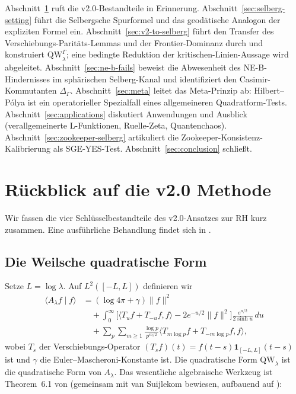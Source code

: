 \documentclass[12pt,a4paper]{article}
\theoremstyle{definition}
\theoremstyle{remark}
\newcommand{\QW}{\mathrm{QW}}
\newcommand{\Delop}{\Delta_{\Gamma}}
\begin{document}
Abschnitt~\ref{sec:v2-recollect} ruft die v2.0-Bestandteile in Erinnerung.
Abschnitt~\ref{sec:selberg-setting} führt die Selbergsche Spurformel und das
geodätische Analogon der expliziten Formel ein.
Abschnitt~\ref{sec:v2-to-selberg} führt den Transfer des Verschiebungs-Paritäts-Lemmas und der
Frontier-Dominanz durch und konstruiert $\QW^\Gamma_\lambda$; eine bedingte
Reduktion der kritischen-Linien-Aussage wird abgeleitet.
Abschnitt~\ref{sec:ne-b-fails} beweist die Abwesenheit des NE-B-Hindernisses im
sphärischen Selberg-Kanal und identifiziert den Casimir-Kommutanten $\Delop$.
Abschnitt~\ref{sec:meta} leitet das Meta-Prinzip ab: Hilbert--Pólya ist ein
operatorieller Spezialfall eines allgemeineren Quadratform-Tests.
Abschnitt~\ref{sec:applications} diskutiert Anwendungen und Ausblick
(verallgemeinerte L-Funktionen, Ruelle-Zeta, Quantenchaos).
Abschnitt~\ref{sec:zookeeper-selberg} artikuliert die Zookeeper-Konsistenz-Kalibrierung als SGE-YES-Test.
Abschnitt~\ref{sec:conclusion} schließt.


\section{Rückblick auf die v2.0 Methode}
\label{sec:v2-recollect}

Wir fassen die vier Schlüsselbestandteile des v2.0-Ansatzes zur RH kurz zusammen. Eine
ausführliche Behandlung findet sich in \cite{Geiger2026partII}.

\subsection{Die Weilsche quadratische Form}

Setze $L = \log\lambda$. Auf $L^2([-L,L])$ definieren wir
\begin{equation}
\label{eq:QW-riemann}
\begin{split}
\langle A_\lambda f\mid f\rangle
&= (\log 4\pi + \gamma)\|f\|^2 \\
&\quad + \int_0^\infty \Big[\langle T_u f + T_{-u} f, f\rangle - 2e^{-u/2}\|f\|^2\Big]
\frac{e^{u/2}}{2\sinh u}\,du \\
&\quad + \sum_p\sum_{m\ge 1}\frac{\log p}{p^{m/2}}
\langle T_{m\log p} f + T_{-m\log p} f, f\rangle,
\end{split}
\end{equation}
wobei $T_s$ der Verschiebungs-Operator $(T_s f)(t) = f(t-s)\mathbf{1}_{[-L,L]}(t-s)$
ist und $\gamma$ die Euler--Mascheroni-Konstante ist. Die quadratische Form $\QW_\lambda$
ist die quadratische Form von $A_\lambda$.  Das wesentliche algebraische Werkzeug ist
Theorem~6.1 von \cite{Connes2026} (gemeinsam mit van Suijlekom bewiesen,
aufbauend auf \cite{ConnesMoscovici2022}):
\end{document}
